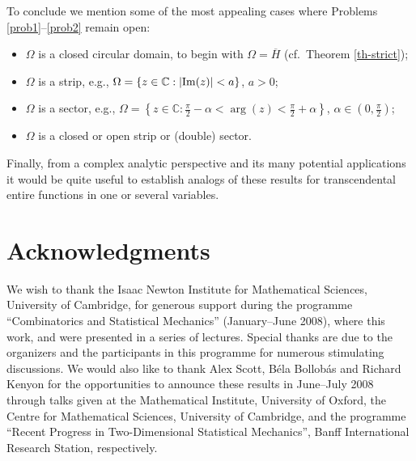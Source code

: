 \documentclass[10pt,reqno]{amsart}
\theoremstyle{plain}
\theoremstyle{definition}
\theoremstyle{remark}
\numberwithin{equation}{section}
\newcommand{\CC}{\mathbb{C}}
\renewcommand{\Im}{{\rm Im}}
\begin{document}
To conclude we mention some of the most appealing cases where 
Problems \ref{prob1}--\ref{prob2} remain open:

\begin{itemize}
\item[(i)] $\Omega$ is a closed circular domain, to begin 
with $\Omega=\overline{H}$ (cf.~Theorem \ref{th-strict});
\item[(ii)] $\Omega$ is a strip, e.g., $\Omega=\{z\in \CC:|\Im(z)|<a\}$, 
$a>0$;
\item[(iii)] $\Omega$ is a sector, e.g., 
$\Omega=\left\{z\in \CC:\frac{\pi}{2}-\alpha<\arg(z)<\frac{\pi}{2}
+\alpha\right\}$, $\alpha\in \left(0,\frac{\pi}{2}\right)$;
\item[(iv)] $\Omega$ is a closed or open strip or (double) sector.
\end{itemize}

Finally, from a complex analytic perspective and its many 
potential applications
\cite{BBCV} it would be quite useful to establish 
analogs of these results for transcendental entire functions in one or 
several variables. 

\section*{Acknowledgments}

We wish to thank the Isaac Newton Institute for Mathematical Sciences, 
University of Cambridge, for generous support during the programme  
``Combinatorics and Statistical Mechanics'' (January--June 2008), 
where this work, \cite{BB-II} and \cite{BBL} 
were presented in a series of lectures. Special thanks are due 
to the organizers and the participants in this programme for 
numerous stimulating discussions. 
We would also like to thank Alex Scott, 
B\'ela Bollob\'as and Richard Kenyon for the opportunities to announce 
these results in June--July 2008 through talks given at the 
Mathematical Institute, University of Oxford, the Centre for Mathematical 
Sciences, University of Cambridge, and the programme ``Recent Progress in 
Two-Dimensional Statistical Mechanics'', Banff International 
Research Station, respectively. 
\end{document}
